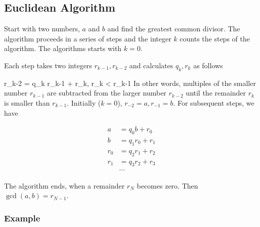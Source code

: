 

\subsection{Euclidean Algorithm}

Start with two numbers, $a$ and $b$ and find the greatest common divisor. The algorithm proceeds in a series of steps and the integer $k$ counts the steps of the algorithm. The algorithms starts with $k=0$.

Each step takes two integers $r_{k-1}, r_{k-2}$ and calculates $q_k, r_k$ as follows

\bee
r_{k-2} = q_k r_{k-1} + r_k, \qquad r_k < r_{k-1}
\eee
%
In other words, multiples of the smaller number $r_{k-1}$ are subtracted from the larger number $r_{k-2}$ until the remainder $r_k$ is smaller than $r_{k-1}$.
%
Initially ($k=0$), $r_{-2} = a, r_{-1} = b$. For subsequent steps, we have

\begin{align*}
  a &= q_0 b + r_0 \\
  b &= q_1 r_0 + r_1 \\
  r_0 &= q_2 r_1 + r_2 \\
  r_1 &= q_3 r_2 + r_3 \\
  &\cdots  
\end{align*}

The algorithm ends, when a remainder $r_N$ becomes zero. Then $\gcd(a,b) = r_{N-1}$.

\subsubsection{Example}



